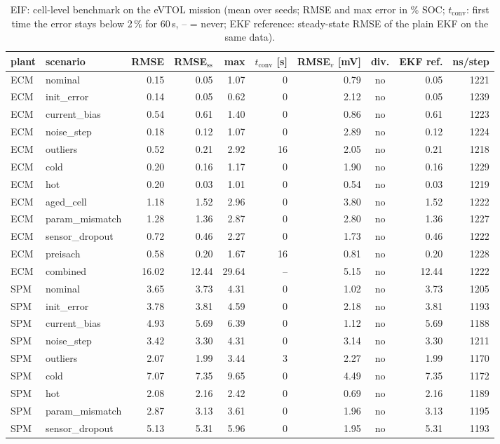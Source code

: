 \begin{table}[H]\centering\footnotesize\setlength{\tabcolsep}{4pt}
\caption{EIF: cell-level benchmark on the eVTOL mission (mean over seeds; RMSE and max error in \% SOC; $t_\mathrm{conv}$: first time the error stays below 2\,\% for 60\,s, -- = never; EKF reference: steady-state RMSE of the plain EKF on the same data).}\label{tab:cell_EIF}
\begin{tabular}{llrrrrrcrr}\toprule
plant & scenario & RMSE & RMSE$_\mathrm{ss}$ & max & $t_\mathrm{conv}$ [s] & RMSE$_v$ [mV] & div. & EKF ref. & ns/step \\ \midrule
ECM & nominal & 0.15 & 0.05 & 1.07 & 0 & 0.79 & no & 0.05 & 1221 \\
ECM & init\_error & 0.14 & 0.05 & 0.62 & 0 & 2.12 & no & 0.05 & 1239 \\
ECM & current\_bias & 0.54 & 0.61 & 1.40 & 0 & 0.86 & no & 0.61 & 1223 \\
ECM & noise\_step & 0.18 & 0.12 & 1.07 & 0 & 2.89 & no & 0.12 & 1224 \\
ECM & outliers & 0.52 & 0.21 & 2.92 & 16 & 2.05 & no & 0.21 & 1218 \\
ECM & cold & 0.20 & 0.16 & 1.17 & 0 & 1.90 & no & 0.16 & 1229 \\
ECM & hot & 0.20 & 0.03 & 1.01 & 0 & 0.54 & no & 0.03 & 1219 \\
ECM & aged\_cell & 1.18 & 1.52 & 2.96 & 0 & 3.80 & no & 1.52 & 1222 \\
ECM & param\_mismatch & 1.28 & 1.36 & 2.87 & 0 & 2.80 & no & 1.36 & 1227 \\
ECM & sensor\_dropout & 0.72 & 0.46 & 2.27 & 0 & 1.73 & no & 0.46 & 1222 \\
ECM & preisach & 0.58 & 0.20 & 1.67 & 16 & 0.81 & no & 0.20 & 1228 \\
ECM & combined & 16.02 & 12.44 & 29.64 & -- & 5.15 & no & 12.44 & 1222 \\
\midrule
SPM & nominal & 3.65 & 3.73 & 4.31 & 0 & 1.02 & no & 3.73 & 1205 \\
SPM & init\_error & 3.78 & 3.81 & 4.59 & 0 & 2.18 & no & 3.81 & 1193 \\
SPM & current\_bias & 4.93 & 5.69 & 6.39 & 0 & 1.12 & no & 5.69 & 1188 \\
SPM & noise\_step & 3.42 & 3.30 & 4.31 & 0 & 3.14 & no & 3.30 & 1211 \\
SPM & outliers & 2.07 & 1.99 & 3.44 & 3 & 2.27 & no & 1.99 & 1170 \\
SPM & cold & 7.07 & 7.35 & 9.65 & 0 & 4.49 & no & 7.35 & 1172 \\
SPM & hot & 2.08 & 2.16 & 2.42 & 0 & 0.69 & no & 2.16 & 1189 \\
SPM & param\_mismatch & 2.87 & 3.13 & 3.61 & 0 & 1.96 & no & 3.13 & 1195 \\
SPM & sensor\_dropout & 5.13 & 5.31 & 5.96 & 0 & 1.95 & no & 5.31 & 1193 \\
\bottomrule\end{tabular}\end{table}
